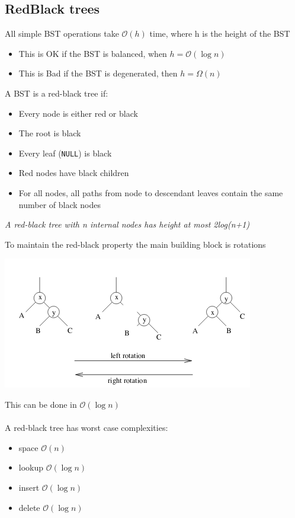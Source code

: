 \documentclass{article}[18pt]
\begin{document}
\subsection{RedBlack trees}
All simple BST operations take $\mathcal{O}(h)$ time, where h is the height of the BST
\begin{itemize}
	\item This is OK if the BST is balanced, when $h=\mathcal{O}(\log n)$
	\item This is Bad if the BST is degenerated, then $h=\Omega(n)$
\end{itemize}
A BST is a red-black tree if:
\begin{itemize}
	\item Every node is either red or black
	\item The root is black
	\item Every leaf (\texttt{NULL}) is black
	\item Red nodes have black children
	\item For all nodes, all paths from node to descendant leaves contain the same number of black nodes
\end{itemize}
\begin{center}
\textit{A red-black tree with n internal nodes has height at most 2log(n+1)}
\end{center}
To maintain the red-black property the main building block is rotations
\begin{center}
\includegraphics[scale=0.7]{Rotation}
\end{center}
This can be done in $\mathcal{O}(\log n)$\\
\\
A red-black tree has worst case complexities:
\begin{itemize}
	\item space $\mathcal{O}(n)$
	\item lookup $\mathcal{O}(\log n)$
	\item insert $\mathcal{O}(\log n)$
	\item delete $\mathcal{O}(\log n)$
\end{itemize}
\end{document}
